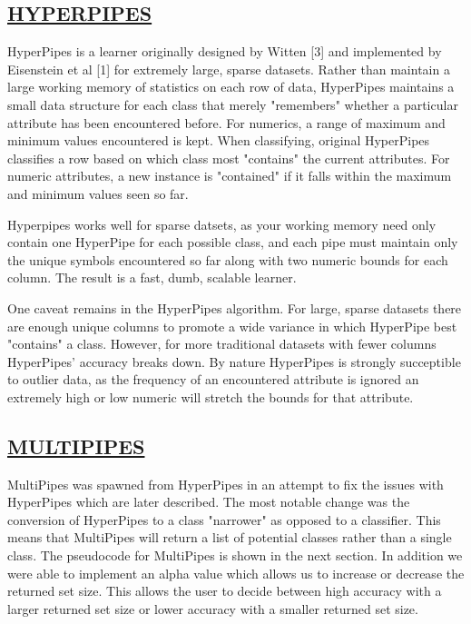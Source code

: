 \begin{kasten}
  \section*{ \hspace{0.1cm} {\color{red} \underline{HYPERPIPES}}}
\large{
HyperPipes is a learner originally designed by Witten [3] and implemented by Eisenstein et al [1] for extremely large, sparse datasets. Rather than maintain a large working memory of statistics on each row of data, HyperPipes maintains a small data structure for each class that merely "remembers" whether a particular attribute has been encountered before. For numerics, a range of maximum and minimum values encountered is kept. When classifying, original HyperPipes classifies a row based on which class most "contains" the current attributes. For numeric attributes, a new instance is "contained" if it falls within the maximum and minimum values seen so far.

\vspace{3 mm}

Hyperpipes works well for sparse datsets, as your working memory need only contain one HyperPipe for each possible class, and each pipe must maintain only the unique symbols encountered so far along with two numeric bounds for each column. The result is a fast, dumb, scalable learner.

\vspace{3 mm}

One caveat remains in the HyperPipes algorithm. For large, sparse datasets there are enough unique columns to promote a wide variance in which HyperPipe best "contains" a class. However, for more traditional datasets with fewer columns HyperPipes' accuracy breaks down. By nature HyperPipes is strongly succeptible to outlier data, as the frequency of an encountered attribute is ignored an extremely high or low numeric will stretch the bounds for that attribute.

}
\end{kasten}

\begin{kasten}
    \section*{ \hspace{0.1cm} {\color{red} \underline{MULTIPIPES}}}
    \large{
MultiPipes was spawned from HyperPipes in an attempt to fix the issues with HyperPipes which are later described. The most notable change was the conversion of HyperPipes to a class "narrower" as opposed to a classifier. This means that MultiPipes will return a list of potential classes rather than a single class. The pseudocode for MultiPipes is shown in the next section. In addition we were able to implement an alpha value which allows us to increase or decrease the returned set size. This allows the user to decide between high accuracy with a larger returned set size or lower accuracy with a smaller returned set size.
}
\end{kasten}
